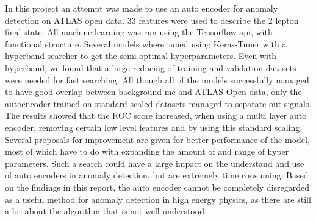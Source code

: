 \documentclass[ reprint, amsmath,amssymb, aps, nofootinbib]{revtex4-2}
\begin{document}
In this project an attempt was made to use an auto encoder for anomaly detection on ATLAS open data. 33 features were used to describe the 2 lepton final state. All machine learning was run using the Tensorflow api, with functional structure. Several models where tuned using Keras-Tuner with a hyperband searcher to get the semi-optimal hyperparameters. Even with hyperband, we found that a large reducing of training and validation datasets were needed for fast searching. All though all of the models successfully managed to have good overlap between background mc and ATLAS Open data, only the autoencoder trained on standard scaled datasets managed to separate out signals. The results showed that the ROC score increased, when using a multi layer auto encoder, removing certain low level features and by using this standard scaling. Several proposals for improvement are given for better performance of the model, most of which have to do with expanding the amount of and range of hyper parameters. Such a search could have a large impact on the understand and use of auto encoders in anomaly detection, but are extremely time consuming. Based on the findings in this report, the auto encoder cannot be completely disregarded as a useful method for anomaly detection in high energy physics, as there are still a lot about the algorithm that is not well understood. 




\mbox{~}
\onecolumngrid
\printbibliography

\newpage
\appendix
\end{document}
